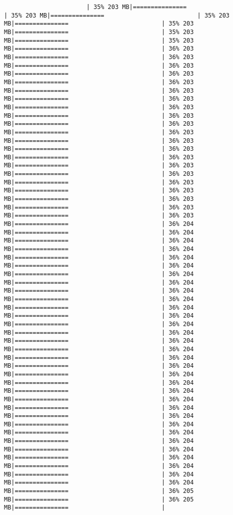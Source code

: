 \documentclass[
]{article}
\begin{document}
\begin{verbatim}
                       | 35% 203 MB|===============                          | 35% 203 MB|===============                          | 35% 203 MB|===============                          | 35% 203 MB|===============                          | 35% 203 MB|===============                          | 35% 203 MB|===============                          | 36% 203 MB|===============                          | 36% 203 MB|===============                          | 36% 203 MB|===============                          | 36% 203 MB|===============                          | 36% 203 MB|===============                          | 36% 203 MB|===============                          | 36% 203 MB|===============                          | 36% 203 MB|===============                          | 36% 203 MB|===============                          | 36% 203 MB|===============                          | 36% 203 MB|===============                          | 36% 203 MB|===============                          | 36% 203 MB|===============                          | 36% 203 MB|===============                          | 36% 203 MB|===============                          | 36% 203 MB|===============                          | 36% 203 MB|===============                          | 36% 203 MB|===============                          | 36% 203 MB|===============                          | 36% 203 MB|===============                          | 36% 203 MB|===============                          | 36% 204 MB|===============                          | 36% 204 MB|===============                          | 36% 204 MB|===============                          | 36% 204 MB|===============                          | 36% 204 MB|===============                          | 36% 204 MB|===============                          | 36% 204 MB|===============                          | 36% 204 MB|===============                          | 36% 204 MB|===============                          | 36% 204 MB|===============                          | 36% 204 MB|===============                          | 36% 204 MB|===============                          | 36% 204 MB|===============                          | 36% 204 MB|===============                          | 36% 204 MB|===============                          | 36% 204 MB|===============                          | 36% 204 MB|===============                          | 36% 204 MB|===============                          | 36% 204 MB|===============                          | 36% 204 MB|===============                          | 36% 204 MB|===============                          | 36% 204 MB|===============                          | 36% 204 MB|===============                          | 36% 204 MB|===============                          | 36% 204 MB|===============                          | 36% 204 MB|===============                          | 36% 204 MB|===============                          | 36% 204 MB|===============                          | 36% 204 MB|===============                          | 36% 204 MB|===============                          | 36% 204 MB|===============                          | 36% 204 MB|===============                          | 36% 205 MB|===============                          | 36% 205 MB|===============                          | 
\end{verbatim}
\end{document}
